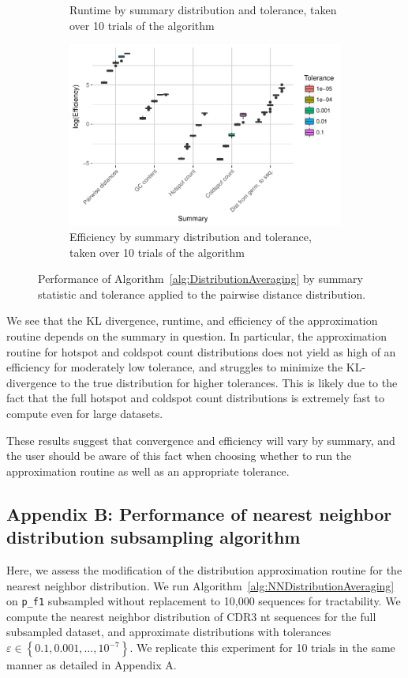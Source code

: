 \documentclass{article}
\begin{document}
\begin{figure}
\begin{subfigure}{0.5\textwidth}
        \caption{Runtime by summary distribution and tolerance, taken over 10 trials of the algorithm}
        \label{fig:TimeBySummary}
    \end{subfigure}
    \begin{subfigure}{0.5\textwidth}
        \includegraphics[width=\linewidth]{Figures/Multiple/efficiency_by_summary_and_tol.pdf}
        \caption{Efficiency by summary distribution and tolerance, taken over 10 trials of the algorithm}
        \label{fig:EfficiencyBySummary}
    \end{subfigure}
    \caption{Performance of Algorithm~\ref{alg:DistributionAveraging} by summary statistic and tolerance applied to the pairwise distance distribution.}
\end{figure}
We see that the KL divergence, runtime, and efficiency of the approximation routine depends on the summary in question.
In particular, the approximation routine for hotspot and coldspot count distributions does not yield as high of an efficiency for moderately low tolerance, and struggles to minimize the KL-divergence to the true distribution for higher tolerances.
This is likely due to the fact that the full hotspot and coldspot count distributions is extremely fast to compute even for large datasets.

These results suggest that convergence and efficiency will vary by summary, and the user should be aware of this fact when choosing whether to run the approximation routine as well as an appropriate tolerance.

\subsection*{Appendix B: Performance of nearest neighbor distribution subsampling algorithm}
Here, we assess the modification of the distribution approximation routine for the nearest neighbor distribution.
We run Algorithm~\ref{alg:NNDistributionAveraging} on \texttt{p\_f1} subsampled without replacement to 10,000 sequences for tractability.
We compute the nearest neighbor distribution of CDR3 nt sequences for the full subsampled dataset, and approximate distributions with tolerances $\varepsilon \in \left\{0.1, 0.001, \dotsc, 10^{-7} \right\}$.
We replicate this experiment for 10 trials in the same manner as detailed in Appendix A.
\end{document}
